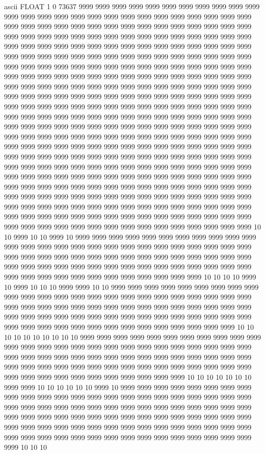 ascii
FLOAT
1
0 73637 
9999 9999 9999 9999 9999 9999 9999 9999 9999 9999 9999 9999 9999 9999 9999 9999 9999 9999 9999 9999 9999 9999 9999 9999 9999 9999 9999 9999 9999 9999 9999 9999 9999 9999 9999 9999 9999 9999 9999 9999 9999 9999 9999 9999 9999 9999 9999 9999 9999 9999 9999 9999 9999 9999 9999 9999 9999 9999 9999 9999 9999 9999 9999 9999 9999 9999 9999 9999 9999 9999 9999 9999 9999 9999 9999 9999 9999 9999 9999 9999 9999 9999 9999 9999 9999 9999 9999 9999 9999 9999 9999 9999 9999 9999 9999 9999 9999 9999 9999 9999 9999 9999 9999 9999 9999 9999 9999 9999 9999 9999 9999 9999 9999 9999 9999 9999 9999 9999 9999 9999 9999 9999 9999 9999 9999 9999 9999 9999 9999 9999 9999 9999 9999 9999 9999 9999 9999 9999 9999 9999 9999 9999 9999 9999 9999 9999 9999 9999 9999 9999 9999 9999 9999 9999 9999 9999 9999 9999 9999 9999 9999 9999 9999 9999 9999 9999 9999 9999 9999 9999 9999 9999 9999 9999 9999 9999 9999 9999 9999 9999 9999 9999 9999 9999 9999 9999 9999 9999 9999 9999 9999 9999 9999 9999 9999 9999 9999 9999 9999 9999 9999 9999 9999 9999 9999 9999 9999 9999 9999 9999 9999 9999 9999 9999 9999 9999 9999 9999 9999 9999 9999 9999 9999 9999 9999 9999 9999 9999 9999 9999 9999 9999 9999 9999 9999 9999 9999 9999 9999 9999 9999 9999 9999 9999 9999 9999 9999 9999 9999 9999 9999 9999 9999 9999 9999 9999 9999 9999 9999 9999 9999 9999 9999 9999 9999 9999 9999 9999 9999 9999 9999 9999 9999 9999 9999 9999 9999 9999 9999 9999 9999 9999 9999 9999 9999 9999 9999 9999 9999 9999 9999 9999 9999 9999 9999 9999 9999 9999 9999 9999 9999 9999 9999 9999 9999 9999 9999 9999 9999 9999 9999 9999 9999 9999 9999 9999 9999 9999 9999 9999 9999 9999 9999 9999 9999 9999 9999 9999 9999 9999 9999 9999 9999 9999 9999 9999 9999 9999 9999 9999 9999 10 10 9999 10 10 9999 10 9999 9999 9999 9999 9999 9999 9999 9999 9999 9999 9999 9999 9999 9999 9999 9999 9999 9999 9999 9999 9999 9999 9999 9999 9999 9999 9999 9999 9999 9999 9999 9999 9999 9999 9999 9999 9999 9999 9999 9999 9999 9999 9999 9999 9999 9999 9999 9999 9999 9999 9999 9999 9999 9999 9999 9999 9999 9999 9999 9999 9999 9999 9999 9999 9999 9999 9999 9999 10 10 10 10 9999 10 9999 10 10 10 9999 9999 10 10 9999 9999 9999 9999 9999 9999 9999 9999 9999 9999 9999 9999 9999 9999 9999 9999 9999 9999 9999 9999 9999 9999 9999 9999 9999 9999 9999 9999 9999 9999 9999 9999 9999 9999 9999 9999 9999 9999 9999 9999 9999 9999 9999 9999 9999 9999 9999 9999 9999 9999 9999 9999 9999 9999 9999 9999 9999 9999 9999 9999 9999 9999 9999 9999 9999 9999 9999 9999 10 10 10 10 10 10 10 10 10 10 9999 9999 9999 9999 9999 9999 9999 9999 9999 9999 9999 9999 9999 9999 9999 9999 9999 9999 9999 9999 9999 9999 9999 9999 9999 9999 9999 9999 9999 9999 9999 9999 9999 9999 9999 9999 9999 9999 9999 9999 9999 9999 9999 9999 9999 9999 9999 9999 9999 9999 9999 9999 9999 9999 9999 9999 9999 9999 9999 9999 9999 9999 9999 9999 9999 9999 9999 10 10 10 10 10 10 10 9999 9999 10 10 10 10 10 10 9999 10 9999 9999 9999 9999 9999 9999 9999 9999 9999 9999 9999 9999 9999 9999 9999 9999 9999 9999 9999 9999 9999 9999 9999 9999 9999 9999 9999 9999 9999 9999 9999 9999 9999 9999 9999 9999 9999 9999 9999 9999 9999 9999 9999 9999 9999 9999 9999 9999 9999 9999 9999 9999 9999 9999 9999 9999 9999 9999 9999 9999 9999 9999 9999 9999 9999 9999 9999 9999 9999 9999 9999 9999 9999 9999 9999 9999 9999 9999 9999 9999 9999 9999 9999 9999 10 10 10 
